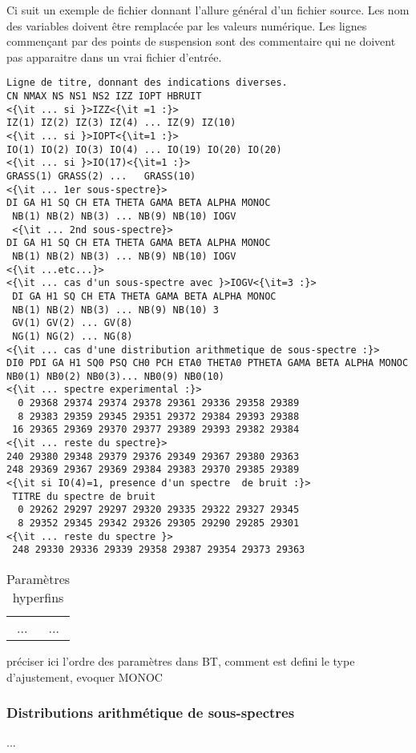 Ci suit un exemple de fichier donnant l'allure général d'un fichier source.
Les nom des variables doivent être remplacée par les valeurs numérique.
Les lignes commençant par des points de suspension sont des commentaire qui ne doivent pas apparaitre dans un vrai fichier d'entrée.
\begin{lstlisting}[frame=single,escapeinside=<>]
Ligne de titre, donnant des indications diverses.
CN NMAX NS NS1 NS2 IZZ IOPT HBRUIT
<{\it ... si }>IZZ<{\it =1 :}>
IZ(1) IZ(2) IZ(3) IZ(4) ... IZ(9) IZ(10)
<{\it ... si }>IOPT<{\it=1 :}>
IO(1) IO(2) IO(3) IO(4) ... IO(19) IO(20) IO(20)
<{\it ... si }>IO(17)<{\it=1 :}>
GRASS(1) GRASS(2) ...   GRASS(10) 
<{\it ... 1er sous-spectre}>
DI GA H1 SQ CH ETA THETA GAMA BETA ALPHA MONOC
 NB(1) NB(2) NB(3) ... NB(9) NB(10) IOGV
 <{\it ... 2nd sous-spectre}>
DI GA H1 SQ CH ETA THETA GAMA BETA ALPHA MONOC   
 NB(1) NB(2) NB(3) ... NB(9) NB(10) IOGV
<{\it ...etc...}>
<{\it ... cas d'un sous-spectre avec }>IOGV<{\it=3 :}>
 DI GA H1 SQ CH ETA THETA GAMA BETA ALPHA MONOC
 NB(1) NB(2) NB(3) ... NB(9) NB(10) 3
 GV(1) GV(2) ... GV(8)
 NG(1) NG(2) ... NG(8)
<{\it ... cas d'une distribution arithmetique de sous-spectre :}>
DI0 PDI GA H1 SQ0 PSQ CH0 PCH ETA0 THETA0 PTHETA GAMA BETA ALPHA MONOC
NB0(1) NB0(2) NB0(3)... NB0(9) NB0(10)
<{\it ... spectre experimental :}>
  0 29368 29374 29374 29378 29361 29336 29358 29389
  8 29383 29359 29345 29351 29372 29384 29393 29388
 16 29365 29369 29370 29377 29389 29393 29382 29384
<{\it ... reste du spectre}>
240 29380 29348 29379 29376 29349 29367 29380 29363
248 29369 29367 29369 29384 29383 29370 29385 29389
<{\it si IO(4)=1, presence d'un spectre  de bruit :}>
 TITRE du spectre de bruit
  0 29262 29297 29297 29320 29335 29322 29327 29345
  8 29352 29345 29342 29326 29305 29290 29285 29301
<{\it ... reste du spectre }>
 248 29330 29336 29339 29358 29387 29354 29373 29363
 \end{lstlisting}

\begin{table}
\caption{Paramètres hyperfins}
\begin{tabular}{c|c}
...&...\\
\end{tabular}
\end{table}
préciser ici l'ordre des paramètres dans BT, comment est defini le type d'ajustement, 
evoquer MONOC
\FloatBarrier
\subsubsection{Distributions arithmétique de sous-spectres}
...
\newpage
